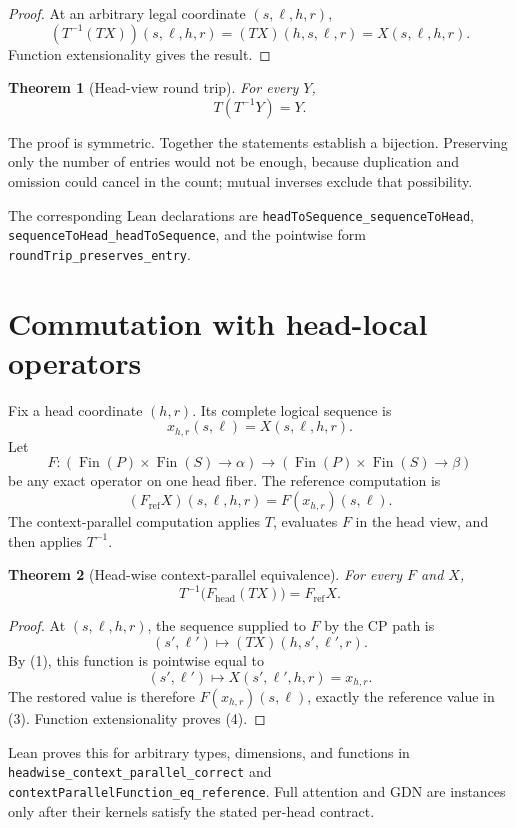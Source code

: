 \documentclass[11pt,a4paper]{article}
\newtheorem{theorem}{Theorem}
\newcommand{\Fin}{\operatorname{Fin}}
\begin{document}
\begin{proof}
At an arbitrary legal coordinate $(s,\ell,h,r)$,
\[
(T^{-1}(TX))(s,\ell,h,r)=(TX)(h,s,\ell,r)=X(s,\ell,h,r).
\]
Function extensionality gives the result.
\end{proof}

\begin{theorem}[Head-view round trip]
For every $Y$,
\[
T(T^{-1}Y)=Y.
\]
\end{theorem}

The proof is symmetric. Together the statements establish a bijection. Preserving only the number of entries would not be enough, because duplication and omission could cancel in the count; mutual inverses exclude that possibility.

The corresponding Lean declarations are \texttt{headToSequence\_sequenceToHead}, \texttt{sequenceToHead\_headToSequence}, and the pointwise form \texttt{roundTrip\_preserves\_entry}.

\section{Commutation with head-local operators}

Fix a head coordinate $(h,r)$. Its complete logical sequence is
\[
x_{h,r}(s,\ell)=X(s,\ell,h,r).
\]
Let
\[
F:(\Fin(P)\times\Fin(S)\to\alpha)
\to(\Fin(P)\times\Fin(S)\to\beta)
\]
be any exact operator on one head fiber. The reference computation is
\[
(F_{\mathrm{ref}}X)(s,\ell,h,r)=F(x_{h,r})(s,\ell). \tag{3}
\]
The context-parallel computation applies $T$, evaluates $F$ in the head view, and then applies $T^{-1}$.

\begin{theorem}[Head-wise context-parallel equivalence]
For every $F$ and $X$,
\[
T^{-1}\bigl(F_{\mathrm{head}}(TX)\bigr)=F_{\mathrm{ref}}X. \tag{4}
\]
\end{theorem}

\begin{proof}
At $(s,\ell,h,r)$, the sequence supplied to $F$ by the CP path is
\[
(s',\ell')\mapsto(TX)(h,s',\ell',r).
\]
By (1), this function is pointwise equal to
\[
(s',\ell')\mapsto X(s',\ell',h,r)=x_{h,r}.
\]
The restored value is therefore $F(x_{h,r})(s,\ell)$, exactly the reference value in (3). Function extensionality proves (4).
\end{proof}

Lean proves this for arbitrary types, dimensions, and functions in \texttt{headwise\_context\_parallel\_correct} and \texttt{contextParallelFunction\_eq\_reference}. Full attention and GDN are instances only after their kernels satisfy the stated per-head contract.
\end{document}
